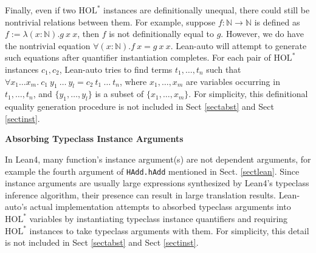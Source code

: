  Finally, even if two $\text{HOL}^*$ instances are definitionally unequal, there could still be nontrivial
relations between them. For example, suppose $f : \mathbb{N} \to \mathbb{N}$ is defined as
$f := \lambda (x : \mathbb{N}). g \ x \ x$, then $f$ is not definitionally equal to $g$. However, we do
have the nontrivial equation $\forall (x : \mathbb{N}). f \ x = g \ x \ x$. Lean-auto will attempt to generate such equations
after quantifier instantiation completes. For each pair of $\text{HOL}^*$ instances $c_1, c_2$,
Lean-auto tries to find terms $t_1, \dots, t_n$ such that $\forall x_1 \dots x_m. \ c_1 \ y_1 \ \dots \ y_l = c_2 \ t_1 \ \dots \ t_n$,
where $x_1, \dots, x_m$ are variables occurring in $t_1, \dots, t_n$, and
$\{y_1, \dots, y_l\}$ is a subset of $\{x_1, \dots, x_m\}$. For simplicity, this
definitional equality generation procedure is not included in Sect \ref{sectabst} and Sect \ref{sectinst}.

\noindent \textbf{Absorbing Typeclass Instance Arguments}

  In Lean4, many function's instance argument(s) are not dependent arguments,
for example the fourth argument of \texttt{HAdd.hAdd} mentioned in Sect. \ref{sectlean}.
Since instance arguments are usually large expressions synthesized by Lean4's typeclass
inference algorithm, their presence can result in large translation results.
Lean-auto's actual implementation attempts to absorbed typeclass arguments into
$\text{HOL}^*$ variables by instantiating typeclass instance quantifiers
and requiring $\text{HOL}^*$ instances to take typeclass arguments with them. For
simplicity, this detail is not included in Sect \ref{sectabst} and Sect \ref{sectinst}.
